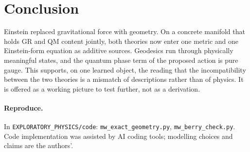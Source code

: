 \documentclass[11pt]{article}
\begin{document}


\section{Conclusion}
Einstein replaced gravitational force with geometry. On a concrete manifold that holds GR and QM
content jointly, both theories now enter one metric and one Einstein-form equation as additive
sources. Geodesics run through physically meaningful states, and the quantum phase term of the
proposed action is pure gauge. This supports, on one learned object, the reading that the
incompatibility between the two theories is a mismatch of descriptions rather than of physics.
It is offered as a working picture to test further, not as a derivation.

\paragraph{Reproduce.} In \texttt{EXPLORATORY\_PHYSICS/code}:
\texttt{mw\_exact\_geometry.py}, \texttt{mw\_berry\_check.py}. Code implementation was assisted by
AI coding tools; modelling choices and claims are the authors'.
\end{document}
